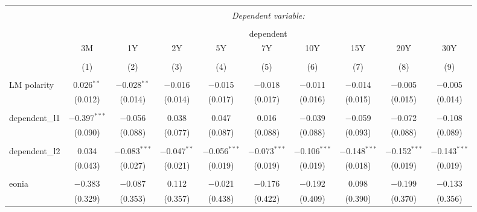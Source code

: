 


\begin{table}[!htbp] \centering 
  \caption{} 
  \label{} 
  \begin{adjustbox}{width=1.35\textwidth}
\begin{tabular}{@{\extracolsep{5pt}}lccccccccc} 
\\[-1.8ex]\hline 
\hline \\[-1.8ex] 
 & \multicolumn{9}{c}{\textit{Dependent variable:}} \\ 
\cline{2-10} 
\\[-1.8ex] & \multicolumn{9}{c}{dependent} \\ 
 & 3M & 1Y & 2Y & 5Y & 7Y & 10Y & 15Y & 20Y & 30Y \\ 
\\[-1.8ex] & (1) & (2) & (3) & (4) & (5) & (6) & (7) & (8) & (9)\\ 
\hline \\[-1.8ex] 
 LM polarity & 0.026$^{**}$ & $-$0.028$^{**}$ & $-$0.016 & $-$0.015 & $-$0.018 & $-$0.011 & $-$0.014 & $-$0.005 & $-$0.005 \\ 
  & (0.012) & (0.014) & (0.014) & (0.017) & (0.017) & (0.016) & (0.015) & (0.015) & (0.014) \\ 
  & & & & & & & & & \\ 
 dependent\_l1 & $-$0.397$^{***}$ & $-$0.056 & 0.038 & 0.047 & 0.016 & $-$0.039 & $-$0.059 & $-$0.072 & $-$0.108 \\ 
  & (0.090) & (0.088) & (0.077) & (0.087) & (0.088) & (0.088) & (0.093) & (0.088) & (0.089) \\ 
  & & & & & & & & & \\ 
 dependent\_l2 & 0.034 & $-$0.083$^{***}$ & $-$0.047$^{**}$ & $-$0.056$^{***}$ & $-$0.073$^{***}$ & $-$0.106$^{***}$ & $-$0.148$^{***}$ & $-$0.152$^{***}$ & $-$0.143$^{***}$ \\ 
  & (0.043) & (0.027) & (0.021) & (0.019) & (0.019) & (0.019) & (0.018) & (0.019) & (0.019) \\ 
  & & & & & & & & & \\ 
 eonia & $-$0.383 & $-$0.087 & 0.112 & $-$0.021 & $-$0.176 & $-$0.192 & 0.098 & $-$0.199 & $-$0.133 \\ 
  & (0.329) & (0.353) & (0.357) & (0.438) & (0.422) & (0.409) & (0.390) & (0.370) & (0.356) \\ 

\end{tabular}
\end{adjustbox}
\end{table}
